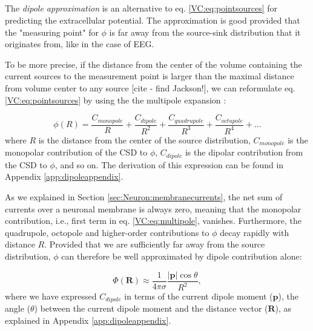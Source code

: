 \subsection{}
\label{sec:VC:dipole}
The \textit{dipole approximation}  is an alternative to eq. \ref{VC:eq:pointsources} for predicting the extracellular potential. The approximation is good provided that the "measuring point" for $\phi$ is far away from the source-sink distribution that it originates from, like in the case of EEG.

To be more precise, if the distance from the center of the volume containing the current sources to the measurement point is larger than the maximal distance from volume center to any source [cite - find Jackson!], we can reformulate eq. \ref{VC:eq:pointsources} by using the the multipole expansion \citep{Nunez2006}:

\begin{equation}
\phi(R) = \frac{C_{monopole}}{R} + \frac{C_{dipole}}{R^2} + \frac{C_{quadrupole}}{R^3} + \frac{C_{octupole}}{R^4} + ...
\label{VC:eq:multipole}
\end{equation}
where $R$ is the distance from the center of the source distribution, $C_{monopole}$ is the monopolar contribution of the CSD to $\phi$, $C_{dipole}$ is the dipolar contribution from the CSD to $\phi$, and so on. The derivation of this expression can be found in Appendix \ref{app:dipoleappendix}. 

As we explained in Section \ref{sec:Neuron:membranecurrents}, the net sum of currents over a neuronal membrane is always zero, meaning that the monopolar contribution, i.e., first term in eq. \ref{VC:eq:multipole}, vanishes. Furthermore, the quadrupole, octopole and higher-order contributions to $\phi$ decay rapidly with distance $R$. Provided that we are sufficiently far away from the source distribution, $\phi$ can therefore be well approximated by dipole contribution alone:

\begin{equation}\label{VC:eq:CDA}
\Phi(\mathbf{R}) \approx \frac{1}{4 \pi \sigma} \frac{|\mathbf{p}| \cos \theta}{R^2},
\end{equation}
where we have expressed $C_{dipole}$ in terms of the current dipole moment ($\mathbf{p}$), the angle ($\theta$) between the current dipole moment and the distance vector ($\mathbf{R}$), as explained in Appendix \ref{app:dipoleappendix}. 

